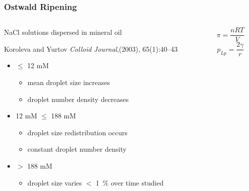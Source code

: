 \documentclass[10pt]{beamer}
\begin{document}
\begin{frame}
\frametitle{Ostwald Ripening}
\begin{columns}
\begin{column}{0.5\textwidth}
\begin{block}{NaCl solutions dispersed in mineral oil}

Koroleva and Yurtov {\em Colloid Journal},(2003), 65(1):40--43
\end{block}

\vspace{2 mm}
\begin{itemize}
\item $\leq$ 12 mM
\begin{itemize}
\item mean droplet size increases
\item droplet number density decreases
\end{itemize}
\item 12 mM $\leq$ 188 mM
\begin{itemize}
\item droplet size redistribution occurs
\item constant droplet number density
\end{itemize} 
\item $>$ 188 mM
\begin{itemize}
\item droplet size varies $<$ 1~\% over time studied
\end{itemize} 
\end{itemize} 


\end{column}

\begin{column}{0.45\textwidth}
\vspace{5mm}
\[\pi = \frac{nRT}{V} \]
\[p_{Lp} = \frac{2\gamma}{r}\]
\end{column}
\end{columns}
\end{frame}
 
\end{document}
